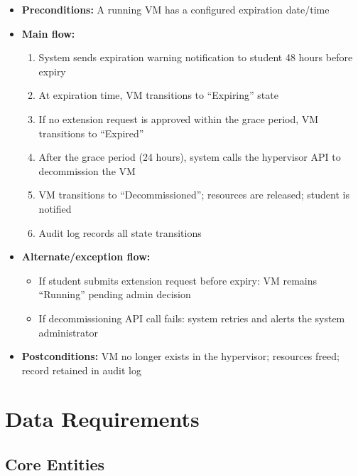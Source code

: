 \documentclass[12pt,letterpaper]{article}
\begin{document}
\begin{itemize}
  \item \textbf{Preconditions:} A running VM has a configured expiration date/time
  \item \textbf{Main flow:}
    \begin{enumerate}
      \item System sends expiration warning notification to student 48 hours before expiry
      \item At expiration time, VM transitions to ``Expiring'' state
      \item If no extension request is approved within the grace period, VM transitions to ``Expired''
      \item After the grace period (24 hours), system calls the hypervisor API to decommission the VM
      \item VM transitions to ``Decommissioned''; resources are released; student is notified
      \item Audit log records all state transitions
    \end{enumerate}
  \item \textbf{Alternate/exception flow:}
    \begin{itemize}
      \item If student submits extension request before expiry: VM remains ``Running'' pending admin decision
      \item If decommissioning API call fails: system retries and alerts the system administrator
    \end{itemize}
  \item \textbf{Postconditions:} VM no longer exists in the hypervisor; resources freed; record retained in audit log
\end{itemize}

\section{Data Requirements}

\subsection{Core Entities}
\end{document}

